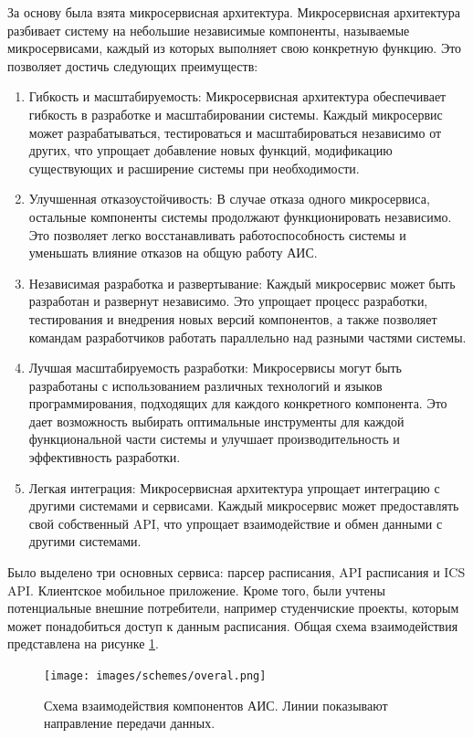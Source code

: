 За основу была взята микросервисная архитектура.
Микросервисная архитектура разбивает систему на небольшие независимые компоненты,
называемые микросервисами, каждый из которых выполняет свою конкретную функцию.
Это позволяет достичь следующих преимуществ:

\begin{enumerate}
  \item Гибкость и масштабируемость: Микросервисная архитектура обеспечивает гибкость в разработке и масштабировании системы.
  Каждый микросервис может разрабатываться, тестироваться и масштабироваться независимо от других,
  что упрощает добавление новых функций, модификацию существующих и расширение системы при необходимости.
  \item Улучшенная отказоустойчивость: В случае отказа одного микросервиса,
  остальные компоненты системы продолжают функционировать независимо.
  Это позволяет легко восстанавливать работоспособность системы и
  уменьшать влияние отказов на общую работу АИС.
  \item Независимая разработка и развертывание: Каждый микросервис может быть разработан
  и развернут независимо. Это упрощает процесс разработки, тестирования и
  внедрения новых версий компонентов, а также позволяет командам разработчиков
  работать параллельно над разными частями системы.
  \item Лучшая масштабируемость разработки: Микросервисы могут быть разработаны с
  использованием различных технологий и языков программирования, подходящих для каждого
  конкретного компонента. Это дает возможность выбирать оптимальные инструменты для
  каждой функциональной части системы и улучшает производительность и эффективность разработки.
  \item Легкая интеграция: Микросервисная архитектура упрощает интеграцию с другими
  системами и сервисами. Каждый микросервис может предоставлять свой собственный API,
  что упрощает взаимодействие и обмен данными с другими системами.
\end{enumerate}

Было выделено три основных сервиса: парсер расписания, API расписания и ICS API.
Клиентское мобильное приложение. Кроме того, были учтены потенциальные внешние потребители,
например студенчиские проекты, которым может понадобиться доступ к данным расписания.
Общая схема взаимодействия представлена на рисунке \ref{fig:schemes:overal}.

\begin{figure}
  \centering
  \texttt{[image: images/schemes/overal.png]}
  \caption{Схема взаимодействия компонентов АИС. Линии показывают направление передачи данных.}
  \label{fig:schemes:overal}
\end{figure}

